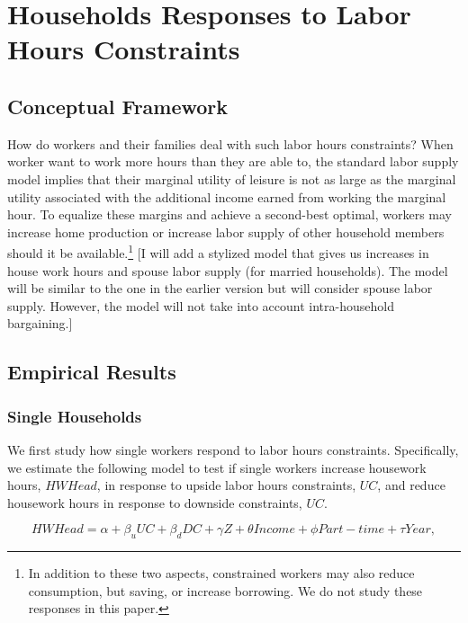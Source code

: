 \section{Households Responses to Labor Hours Constraints}

\subsection{Conceptual Framework}

How do workers and their families deal with such labor hours constraints?  When worker want to work more hours than they are able to, the standard labor supply model implies that their marginal utility of leisure is not as large as the marginal utility associated with the additional income earned from working the marginal hour. To equalize these margins and achieve a second-best optimal, workers may increase home production or increase labor supply of other household members should it be available.\footnote{In addition to these two aspects, constrained workers may also reduce consumption, but saving, or increase borrowing.  We do not study these responses in this paper.} [I will add a stylized model that gives us increases in house work hours and spouse labor supply (for married households).  The model will be similar to the one in the earlier version but will consider spouse labor supply.  However, the model will not take into account intra-household bargaining.]

\subsection{Empirical Results}

\subsubsection{Single Households}

We first study how single workers respond to labor hours constraints. Specifically, we estimate the following model to test if single workers increase housework hours, $HWHead$, in response to upside labor hours constraints, $UC$, and reduce housework hours in response to downside constraints, $UC$.

\begin{equation} \label{housework}
HWHead = \alpha + \beta_u UC + \beta_d DC + \gamma Z + \theta Income + \phi Part-time + \tau Year,
\end{equation}

